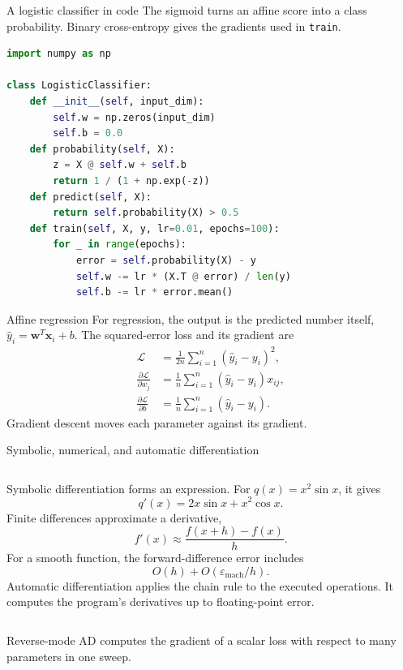 \documentclass[aspectratio=169]{beamer}
\begin{document}
\begin{frame}[fragile]{A logistic classifier in code}
The sigmoid turns an affine score into a class probability.
Binary cross-entropy gives the gradients used in \texttt{train}.
\begin{lstlisting}[language=Python]
import numpy as np

class LogisticClassifier:
    def __init__(self, input_dim):
        self.w = np.zeros(input_dim)
        self.b = 0.0
    def probability(self, X):
        z = X @ self.w + self.b
        return 1 / (1 + np.exp(-z))
    def predict(self, X):
        return self.probability(X) > 0.5
    def train(self, X, y, lr=0.01, epochs=100):
        for _ in range(epochs):
            error = self.probability(X) - y
            self.w -= lr * (X.T @ error) / len(y)
            self.b -= lr * error.mean()
\end{lstlisting}
\end{frame}

\begin{frame}{Affine regression}
For regression, the output is the predicted number itself, $\hat y_i=\mathbf w^T\mathbf x_i+b$.
The squared-error loss and its gradient are
\begin{align*}
\mathcal L&=\frac{1}{2n}\sum_{i=1}^{n}(\hat y_i-y_i)^2,\\
\frac{\partial\mathcal L}{\partial w_j}
&=\frac1n\sum_{i=1}^{n}(\hat y_i-y_i)x_{ij},\\
\frac{\partial\mathcal L}{\partial b}
&=\frac1n\sum_{i=1}^{n}(\hat y_i-y_i).
\end{align*}
Gradient descent moves each parameter against its gradient.
\end{frame}

\begin{frame}{Symbolic, numerical, and automatic differentiation}
\begin{columns}[T]
Symbolic differentiation forms an expression.
For $q(x)=x^2\sin x$, it gives
\[
q'(x)=2x\sin x+x^2\cos x.
\]
Finite differences approximate a derivative,
\[
f'(x)\approx\frac{f(x+h)-f(x)}{h}.
\]
For a smooth function, the forward-difference error includes
\[
O(h)+O(\varepsilon_{\text{mach}}/h).
\]
Automatic differentiation applies the chain rule to the executed operations.
It computes the program's derivatives up to floating-point error.
\end{columns}
\medskip
Reverse-mode AD computes the gradient of a scalar loss with respect to many parameters in one sweep.
\end{frame}
\end{document}
